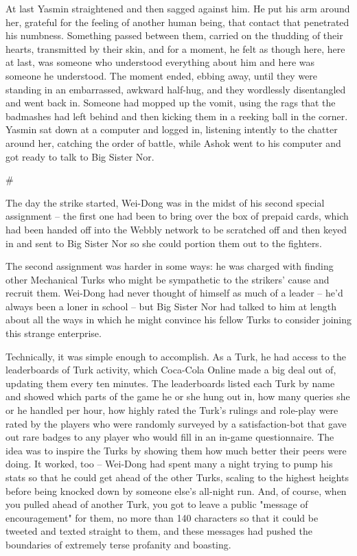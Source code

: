 At last Yasmin straightened and then sagged against him. He put his
arm around her, grateful for the feeling of another human being,
that contact that penetrated his numbness. Something passed between
them, carried on the thudding of their hearts, transmitted by their
skin, and for a moment, he felt as though here, here at last, was
someone who understood everything about him and here was someone he
understood. The moment ended, ebbing away, until they were standing
in an embarrassed, awkward half-hug, and they wordlessly
disentangled and went back in. Someone had mopped up the vomit,
using the rags that the badmashes had left behind and then kicking
them in a reeking ball in the corner. Yasmin sat down at a computer
and logged in, listening intently to the chatter around her,
catching the order of battle, while Ashok went to his computer and
got ready to talk to Big Sister Nor.

\#

The day the strike started, Wei-Dong was in the midst of his second
special assignment -- the first one had been to bring over the box
of prepaid cards, which had been handed off into the Webbly network
to be scratched off and then keyed in and sent to Big Sister Nor so
she could portion them out to the fighters.

The second assignment was harder in some ways: he was charged with
finding other Mechanical Turks who might be sympathetic to the
strikers' cause and recruit them. Wei-Dong had never thought of
himself as much of a leader -- he'd always been a loner in school
-- but Big Sister Nor had talked to him at length about all the
ways in which he might convince his fellow Turks to consider
joining this strange enterprise.

Technically, it was simple enough to accomplish. As a Turk, he had
access to the leaderboards of Turk activity, which Coca-Cola Online
made a big deal out of, updating them every ten minutes. The
leaderboards listed each Turk by name and showed which parts of the
game he or she hung out in, how many queries she or he handled per
hour, how highly rated the Turk's rulings and role-play were rated
by the players who were randomly surveyed by a satisfaction-bot
that gave out rare badges to any player who would fill in an
in-game questionnaire. The idea was to inspire the Turks by showing
them how much better their peers were doing. It worked, too --
Wei-Dong had spent many a night trying to pump his stats so that he
could get ahead of the other Turks, scaling to the highest heights
before being knocked down by someone else's all-night run. And, of
course, when you pulled ahead of another Turk, you got to leave a
public "message of encouragement" for them, no more than 140
characters so that it could be tweeted and texted straight to them,
and these messages had pushed the boundaries of extremely terse
profanity and boasting.

